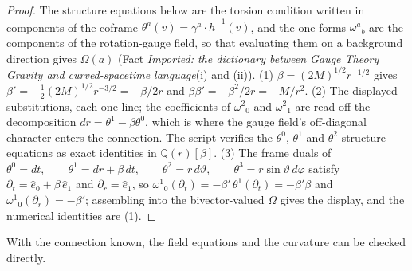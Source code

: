 \documentclass[11pt]{article}
\theoremstyle{definition}
\theoremstyle{plain}
\providecommand{\hb}{}\renewcommand{\hb}{\bar{h}}
\begin{document}
\begin{proof}
The structure equations below are the torsion condition written in components of the coframe $\theta^a(v) = \gamma^a \cdot \hb^{-1}(v)$, and the one-forms $\omega^a{}_b$ are the components of the rotation-gauge field, so that evaluating them on a background direction gives $\Omega(a)$ (Fact \emph{Imported: the dictionary between Gauge Theory Gravity and curved-spacetime language}(i) and (ii)). (1) $\beta = (2M)^{1/2} r^{-1/2}$ gives $\beta' = -\tfrac12 (2M)^{1/2} r^{-3/2} = -\beta/2r$ and $\beta\beta' = -\beta^2/2r = -M/r^2$. (2) The displayed substitutions, each one line; the coefficients of $\omega^2{}_0$ and $\omega^2{}_1$ are read off the decomposition $dr = \theta^1 - \beta\theta^0$, which is where the gauge field's off-diagonal character enters the connection. The script verifies the $\theta^0$, $\theta^1$ and $\theta^2$ structure equations as exact identities in $\mathbb{Q}(r)[\beta]$. (3) The frame duals of $\theta^0 = dt, \qquad \theta^1 = dr + \beta\,dt, \qquad \theta^2 = r\,d\vartheta, \qquad \theta^3 = r\sin\vartheta\,d\varphi$ satisfy $\partial_t = \hat e_0 + \beta\,\hat e_1$ and $\partial_r = \hat e_1$, so $\omega^1{}_0(\partial_t) = -\beta'\,\theta^1(\partial_t) = -\beta'\beta$ and $\omega^1{}_0(\partial_r) = -\beta'$; assembling into the bivector-valued $\Omega$ gives the display, and the numerical identities are (1).

\end{proof}

With the connection known, the field equations and the curvature can be checked directly.
\end{document}
